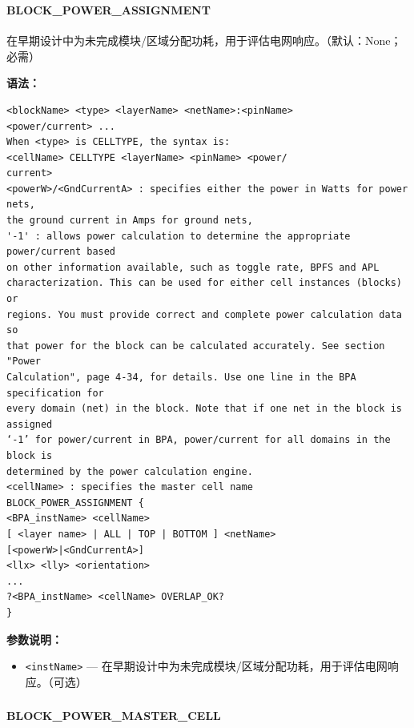 \subsubsection{}
\paragraph*{BLOCK_POWER_ASSIGNMENT}

在早期设计中为未完成模块/区域分配功耗，用于评估电网响应。（默认：None；必需）

\textbf{语法：}
\begin{lstlisting}
<blockName> <type> <layerName> <netName>:<pinName>
<power/current> ...
When <type> is CELLTYPE, the syntax is:
<cellName> CELLTYPE <layerName> <pinName> <power/
current>
<powerW>/<GndCurrentA> : specifies either the power in Watts for power nets,
the ground current in Amps for ground nets,
'-1' : allows power calculation to determine the appropriate power/current based
on other information available, such as toggle rate, BPFS and APL
characterization. This can be used for either cell instances (blocks) or
regions. You must provide correct and complete power calculation data so
that power for the block can be calculated accurately. See section "Power
Calculation", page 4-34, for details. Use one line in the BPA specification for
every domain (net) in the block. Note that if one net in the block is assigned
‘-1’ for power/current in BPA, power/current for all domains in the block is
determined by the power calculation engine.
<cellName> : specifies the master cell name
BLOCK_POWER_ASSIGNMENT {
<BPA_instName> <cellName>
[ <layer name> | ALL | TOP | BOTTOM ] <netName>
[<powerW>|<GndCurrentA>]
<llx> <lly> <orientation>
...
?<BPA_instName> <cellName> OVERLAP_OK?
}
\end{lstlisting}

\textbf{参数说明：}
\begin{itemize}
\item \texttt{<instName>} — 在早期设计中为未完成模块/区域分配功耗，用于评估电网响应。（可选）
\end{itemize}

\subsubsection{}
\paragraph*{BLOCK_POWER_MASTER_CELL}


